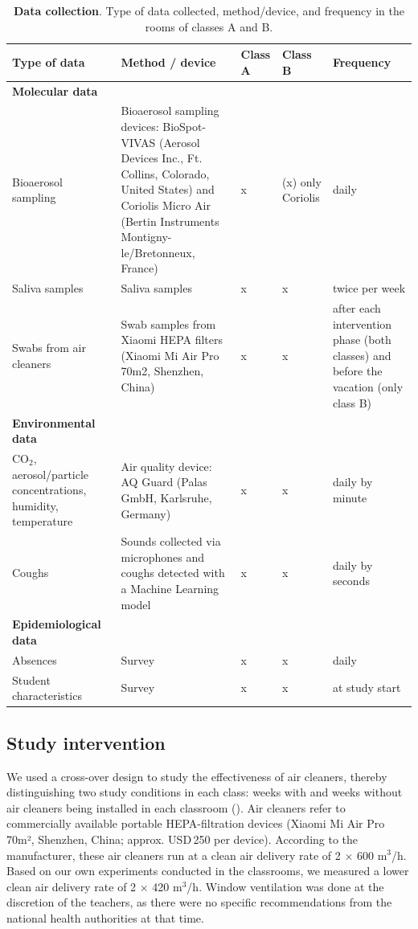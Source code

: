 \documentclass[fleqn,11pt]{wlscirep}
\begin{document}
\begin{table}[!htpb]
    \footnotesize
    \centering
    \caption{\textbf{Data collection}. Type of data collected, method/device, and frequency in the rooms of classes A and B.}
    \begin{tabular}{p{3.5cm}p{6cm} p{1cm} p{1cm} p{3cm}}
    \midrule
    Type of data & Method / device & Class A & Class B & Frequency \\
    \midrule
    \textbf{Molecular data} \\
    \midrule
    Bioaerosol sampling & Bioaerosol sampling devices: BioSpot-VIVAS (Aerosol Devices Inc., Ft. Collins, Colorado, United States) and Coriolis Micro Air (Bertin Instruments Montigny-le/Bretonneux, France) & x & (x) \newline only Coriolis & daily \\
    Saliva samples & Saliva samples & x & x & twice per week \\
    Swabs from air cleaners & Swab samples from Xiaomi HEPA filters (Xiaomi Mi Air Pro 70m2, Shenzhen, China) & x & x & after each intervention phase (both classes) and before the vacation (only class B) \\ 
    \midrule
    \textbf{Environmental data} \\
    \midrule
    CO$_2$, aerosol/particle concentrations, humidity, temperature & Air quality device: AQ Guard (Palas GmbH, Karlsruhe, Germany) & x & x & daily by minute \\
    Coughs & Sounds collected via microphones and coughs detected with a Machine Learning model \cite{Bertschinger2023CBMS} & x & x & daily by seconds \\
    \midrule
    \textbf{Epidemiological data} \\
    \midrule
    Absences & Survey & x & x & daily \\
    Student characteristics & Survey & x & x & at study start \\
    \bottomrule
    \end{tabular}
    \label{tab:data}
\end{table}

\subsection{Study intervention} 

\noindent We used a cross-over design to study the effectiveness of air cleaners, thereby distinguishing two study conditions in each class: weeks with and weeks without air cleaners being installed in each classroom (). Air cleaners refer to commercially available portable HEPA-filtration devices (Xiaomi Mi Air Pro 70m², Shenzhen, China; approx. USD\,250 per device). According to the manufacturer, these air cleaners run at a clean air delivery rate of 2$\,\times\,$600 m$^{3}$/h. Based on our own experiments conducted in the classrooms, we measured a lower clean air delivery rate of 2$\,\times\,$420 m$^{3}$/h. Window ventilation was done at the discretion of the teachers, as there were no specific recommendations from the national health authorities at that time.
\end{document}

